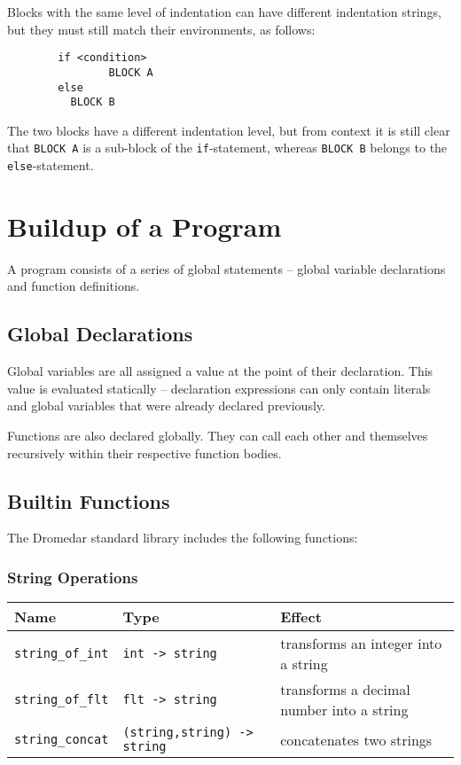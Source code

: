 \documentclass{article}
\newcommand{\code}[1]{\lstinline[columns=fixed]{#1}}
\begin{document}
		Blocks with the same level of indentation can have different indentation strings, but they must still match their environments, as follows:
		
		\begin{lstlisting}
		if <condition>
				BLOCK A
		else
		  BLOCK B
		\end{lstlisting}
		
		The two blocks have a different indentation level, but from context it is still clear that \code{BLOCK A} is a sub-block of the \code{if}-statement, whereas \code{BLOCK B} belongs to the \code{else}-statement.
		
	\section{Buildup of a Program}
	
		A program consists of a series of global statements -- global variable declarations and function definitions.
		
		\subsection{Global Declarations}
		
			Global variables are all assigned a value at the point of their declaration. This value is evaluated statically -- declaration expressions can only contain literals and global variables that were already declared previously.
			
			Functions are also declared globally. They can call each other and themselves recursively within their respective function bodies.
			
		\subsection{Builtin Functions}
		
			The Dromedar standard library includes the following functions:
			
			\subsubsection{String Operations}
			
				\begin{longtable}{l|l|l}
					\textbf{Name} & \textbf{Type} & \textbf{Effect} \\
					\midrule
					\code{string_of_int} & \code{int -> string} & transforms an integer into a string \\
					\code{string_of_flt} & \code{flt -> string} & transforms a decimal number into a string \\
					\code{string_concat} & \code{(string,string) -> string} & concatenates two strings
				\end{longtable}
			
\end{document}
